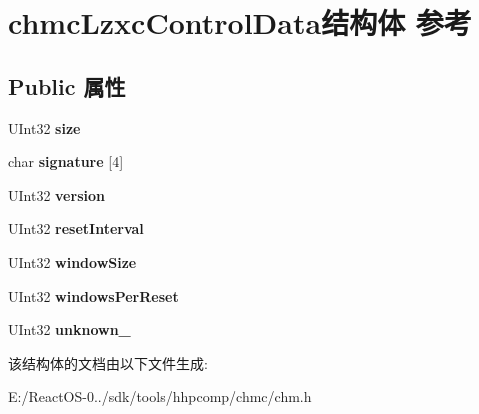 \hypertarget{structchmc_lzxc_control_data}{}\section{chmc\+Lzxc\+Control\+Data结构体 参考}
\label{structchmc_lzxc_control_data}
\subsection*{Public 属性}
\begin{DoxyCompactItemize}
\item 
\mbox{\label{structchmc_lzxc_control_data_a5e6fdd38b08c1475eaed27ca2a17d878}} 
U\+Int32 {\bfseries size}
\item 
\mbox{\label{structchmc_lzxc_control_data_a77229cd476e16dbf8d2a7ec3ad96d8e3}} 
char {\bfseries signature} \mbox{[}4\mbox{]}
\item 
\mbox{\label{structchmc_lzxc_control_data_a02d684b3e3f2922307fc783a65247847}} 
U\+Int32 {\bfseries version}
\item 
\mbox{\label{structchmc_lzxc_control_data_a7edeb6e67e30fa6404dbc34ecfec7405}} 
U\+Int32 {\bfseries reset\+Interval}
\item 
\mbox{\label{structchmc_lzxc_control_data_a1d5d8477bcccd75a32847224c4d7a5ba}} 
U\+Int32 {\bfseries window\+Size}
\item 
\mbox{\label{structchmc_lzxc_control_data_a9fe31605840a79f3311e52b18f1702a7}} 
U\+Int32 {\bfseries windows\+Per\+Reset}
\item 
\mbox{\label{structchmc_lzxc_control_data_ad9a544ae555c5590efdd0d949f99cc8e}} 
U\+Int32 {\bfseries unknown\+\_}
\end{DoxyCompactItemize}


该结构体的文档由以下文件生成\+:\begin{DoxyCompactItemize}
\item 
E\+:/\+React\+O\+S-\/0../sdk/tools/hhpcomp/chmc/chm.\+h\end{DoxyCompactItemize}
